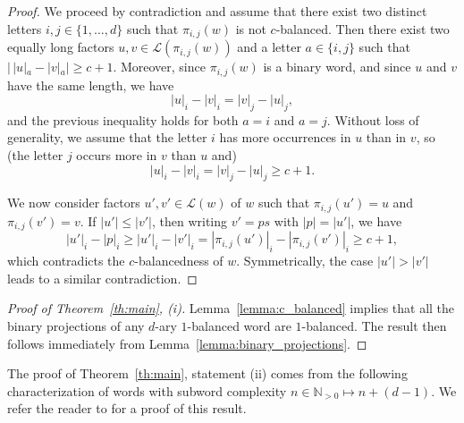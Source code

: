 \documentclass{template_arxiv}
\theoremstyle{definition}
\newcommand{\N}{\mathbb{N}}
\newcommand{\lan}{\mathcal{L}}
\begin{document}
\begin{proof}
We proceed by contradiction and assume that there exist two distinct letters $i,j\in\{1,\ldots,d\}$ such that $\pi_{i,j}(w)$ is not $c$-balanced. Then there exist two equally long factors $u,v\in\lan(\pi_{i,j}(w))$ and a letter $a\in\{i,j\}$ such that $|\,|u|_a-|v|_a|\geq c+1$. Moreover, since $\pi_{i,j}(w)$ is a binary word, and since $u$ and $v$ have the same length, we have
\[
    |u|_i-|v|_i=|v|_j-|u|_j,
\]
and the previous inequality holds for both $a=i$ and $a=j$. Without loss of generality, we assume that the letter $i$ has more occurrences in $u$ than in $v$, so (the letter $j$ occurs more in $v$ than $u$ and)
\[
    |u|_i-|v|_i=|v|_j-|u|_j\geq c+1.
\]

We now consider factors $u',v'\in\lan(w)$ of $w$ such that $\pi_{i,j}(u')=u$ and $\pi_{i,j}(v')=v$. If $|u'|\leq |v'|$, then writing $v'=ps$ with $|p|=|u'|$, we have
\[
    |u'|_{i}-|p|_{i}\geq |u'|_i-|v'|_i=|\pi_{i,j}(u')|_i-|\pi_{i,j}(v')|_i\geq c+1,
\]
which contradicts the $c$-balancedness of $w$. Symmetrically, the case $|u'|>|v'|$ leads to a similar contradiction.
\end{proof}

\begin{proof}[Proof of Theorem~\ref{th:main}, (i)]
Lemma~\ref{lemma:c_balanced} implies that all the binary projections of any $d$-ary $1$-balanced word are $1$-balanced. The result then follows immediately from Lemma~\ref{lemma:binary_projections}.
\end{proof}

The proof of Theorem~\ref{th:main}, statement (ii) comes from the following characterization of words with subword complexity $n\in\N_{>0}\mapsto n+(d-1)$. We refer the reader to \cite[Lemma~1 and Lemma~4]{FM97} for a proof of this result.
\end{document}
